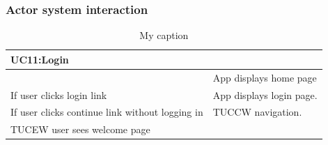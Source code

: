 \documentclass[11pt]{article}
\begin{document}
		\subsubsection{Actor system interaction}
				\begin{table}[ht!]
		\centering
		\caption{My caption}
		\label{my-label}
		\begin{tabular}{|l|l|}
		\hline
		\textbf{UC11:Login}                             & \textbf{}                \\ \hline
								& App displays home page   \\ \hline
		If user clicks login link                       & App displays login page. \\ \hline
		If user clicks continue link without logging in & TUCCW navigation.        \\ \hline
		TUCEW user sees welcome page                    &                          \\ \hline
		\end{tabular}
		\end{table}
		
\end{document}
